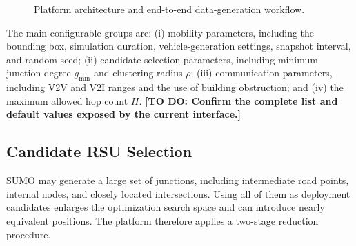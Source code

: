 \documentclass[engproc,proceedingpaper,submit,oneauthor]{Definitions/mdpi}
\newcommand{\todo}[1]{{\color{todored}\textbf{[TO DO: #1]}}}
\newcommand{\CVR}{\mathrm{CVR}}
\begin{document}
\begin{figure}[H]
\centering
{}
\caption{Platform architecture and end-to-end data-generation workflow.}\label{fig:architecture}
\end{figure}

The main configurable groups are: (i) mobility parameters, including the bounding box, simulation duration, vehicle-generation settings, snapshot interval, and random seed; (ii) candidate-selection parameters, including minimum junction degree $g_{\min}$ and clustering radius $\rho$; (iii) communication parameters, including V2V and V2I ranges and the use of building obstruction; and (iv) the maximum allowed hop count $H$. \todo{Confirm the complete list and default values exposed by the current interface.}

\subsection{Candidate RSU Selection}
SUMO may generate a large set of junctions, including intermediate road points, internal nodes, and closely located intersections. Using all of them as deployment candidates enlarges the optimization search space and can introduce nearly equivalent positions. The platform therefore applies a two-stage reduction procedure.
\end{document}
